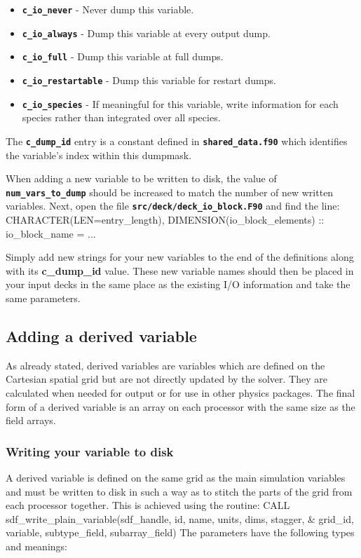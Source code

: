 \documentclass[12pt,a4paper]{article}
\newcommand{\inlinecode}[1]{{\color{warwickred} \bf\texttt{#1}}}
\newcommand{\inlineemph}[1]{{\color{warwicklight} \bf{#1}}}
\newenvironment{boxverbatim}{\lboxverbatim{none}}{\endlboxverbatim}
\begin{document}
\begin{itemize}
\item \inlinecode{c\_io\_never} - Never dump this variable.
\item \inlinecode{c\_io\_always} - Dump this variable at every output dump.
\item \inlinecode{c\_io\_full} - Dump this variable at full dumps.
\item \inlinecode{c\_io\_restartable} - Dump this variable for restart dumps.
\item \inlinecode{c\_io\_species} - If meaningful for this variable, write
  information for each species rather than integrated over all species.
\end{itemize}

The \inlinecode{c\_dump\_id} entry is a constant defined in
\inlinecode{shared\_data.f90} which identifies the variable's index within
this dumpmask.

When adding a new variable to be written to disk, the value of
\inlinecode{num\_vars\_to\_dump} should be increased to match the number of new
written variables. Next, open the file \inlinecode{src/deck/deck\_io\_block.F90}
and find the line:
\begin{boxverbatim}
  CHARACTER(LEN=entry_length), DIMENSION(io_block_elements) :: io_block_name = ...
\end{boxverbatim}

Simply add new strings for your new variables to the end of the
definitions along with its \inlineemph{c\_dump\_id} value. These new variable
names should then be placed in your input decks
in the same place as the existing I/O information and take the same parameters.

\subsection{Adding a derived variable}

As already stated, derived variables are variables which are defined on the
Cartesian spatial grid but are not directly updated by the solver. They are
calculated when needed for output or for use in other physics packages. The
final form of a derived variable is an array on each processor with the same
size as the field arrays.

\subsubsection{Writing your variable to disk}
A derived variable is defined on the same grid as the main simulation variables
and must be written to disk in such a way as to stitch the parts of the grid
from each processor together. This is achieved using the routine:
\begin{boxverbatim}
CALL sdf_write_plain_variable(sdf_handle, id, name, units, dims, stagger, &
    grid_id, variable, subtype_field, subarray_field)
\end{boxverbatim}
The parameters have the following types and meanings:
\end{document}
